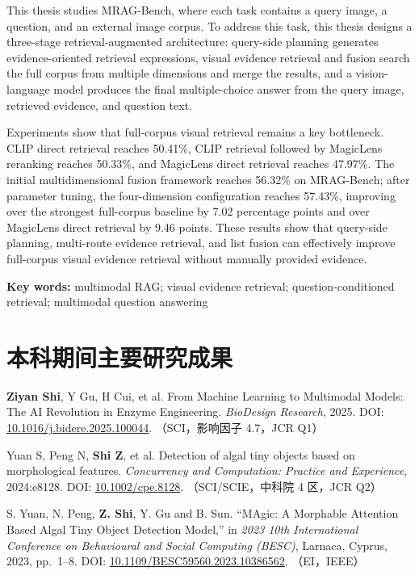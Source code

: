 \documentclass[12pt,openany]{report}
\makeatletter
\renewcommand\tableofcontents{%
  \chapter*{\contentsname
    \@mkboth{\MakeUppercase\contentsname}{\MakeUppercase\contentsname}}%
  \begingroup
    \songti\zihao{-4}\setstretch{1.5}%
    \@starttoc{toc}%
  \endgroup
}
\newcommand{\researchheading}[1]{%
  \par\noindent{\bfseries #1：}\par
}
\newenvironment{researchitems}{%
  \begin{sloppypar}
  \begin{enumerate}[label={[\arabic*]},leftmargin=2em,labelsep=1em,itemsep=0.5\baselineskip,topsep=0.5\baselineskip,parsep=0pt]
}{%
  \end{enumerate}
  \end{sloppypar}
}
\makeatother
\begin{document}
This thesis studies MRAG-Bench, where each task contains a query image, a question, and an external image corpus. To address this task, this thesis designs a three-stage retrieval-augmented architecture: query-side planning generates evidence-oriented retrieval expressions, visual evidence retrieval and fusion search the full corpus from multiple dimensions and merge the results, and a vision-language model produces the final multiple-choice answer from the query image, retrieved evidence, and question text.

Experiments show that full-corpus visual retrieval remains a key bottleneck. CLIP direct retrieval reaches 50.41\%, CLIP retrieval followed by MagicLens reranking reaches 50.33\%, and MagicLens direct retrieval reaches 47.97\%. The initial multidimensional fusion framework reaches 56.32\% on MRAG-Bench; after parameter tuning, the four-dimension configuration reaches 57.43\%, improving over the strongest full-corpus baseline by 7.02 percentage points and over MagicLens direct retrieval by 9.46 points. These results show that query-side planning, multi-route evidence retrieval, and list fusion can effectively improve full-corpus visual evidence retrieval without manually provided evidence.

{\small\noindent\textbf{Key words:} multimodal RAG; visual evidence retrieval; question-conditioned retrieval; multimodal question answering\par}

\tableofcontents
\clearpage
\pagestyle{fancy}



\cleardoublepage
\chapter*{本科期间主要研究成果}

\researchheading{发表论文}
\begin{researchitems}
\item \textbf{Ziyan Shi}, Y Gu, H Cui, et al. From Machine Learning to Multimodal Models: The AI Revolution in Enzyme Engineering. \textit{BioDesign Research}, 2025. DOI: \href{https://doi.org/10.1016/j.bidere.2025.100044}{10.1016/j.bidere.2025.100044}. （SCI，影响因子 4.7，JCR Q1）
\item Yuan S, Peng N, \textbf{Shi Z}, et al. Detection of algal tiny objects based on morphological features. \textit{Concurrency and Computation: Practice and Experience}, 2024:e8128. DOI: \href{https://www.semanticscholar.org/paper/cfffa8e8e1c916e32f03488e518ef1ee18937dd2}{10.1002/cpe.8128}. （SCI/SCIE，中科院 4 区，JCR Q2）
\item S. Yuan, N. Peng, \textbf{Z. Shi}, Y. Gu and B. Sun. ``MAgic: A Morphable Attention Based Algal Tiny Object Detection Model,'' in \textit{2023 10th International Conference on Behavioural and Social Computing (BESC)}, Larnaca, Cyprus, 2023, pp.~1--8. DOI: \href{https://doi.org/10.1109/BESC59560.2023.10386562}{10.1109/BESC59560.2023.10386562}. （EI，IEEE）
\end{researchitems}
\end{document}
